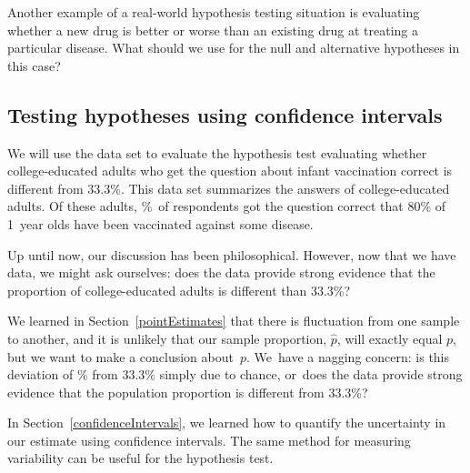 \begin{exercisewrap}
\begin{nexercise}
  Another example of a real-world hypothesis testing situation
  is evaluating whether a new drug is better or worse
  than an existing drug at treating a particular disease.
  What should we use for the null and alternative hypotheses in
  this case?\footnotemark{}
\end{nexercise}
\end{exercisewrap}


\subsection{Testing hypotheses using confidence intervals}
\label{utilizingOurCI}


We will use the 
data set to evaluate
the hypothesis test evaluating whether college-educated adults
who get the question about infant vaccination correct is different
from 33.3\%.
This data set summarizes the answers of \roslingAsize{}
college-educated adults.
Of these \roslingAsize{} adults, \roslingApercent{}\%~of
respondents got the question correct that 80\% of 1~year olds
have been vaccinated against some disease.

Up until now, our discussion has been philosophical.
However, now that we have data, we might ask ourselves:
does the data provide strong evidence that the proportion
of college-educated adults is different than 33.3\%?

We learned in Section~\ref{pointEstimates} that there is
fluctuation from one sample to another, and it is unlikely
that our sample proportion, $\hat{p}$,
will exactly equal $p$, but we want to make
a conclusion about~$p$.
We~have a nagging concern:
is this deviation of \roslingApercent{}\%
from 33.3\% simply due to chance,
or~does the data provide strong evidence that the
population proportion is different from 33.3\%?

In Section~\ref{confidenceIntervals}, we learned how to
quantify the uncertainty in our estimate using confidence
intervals. 
The same method for measuring variability can be useful
for the hypothesis test.

